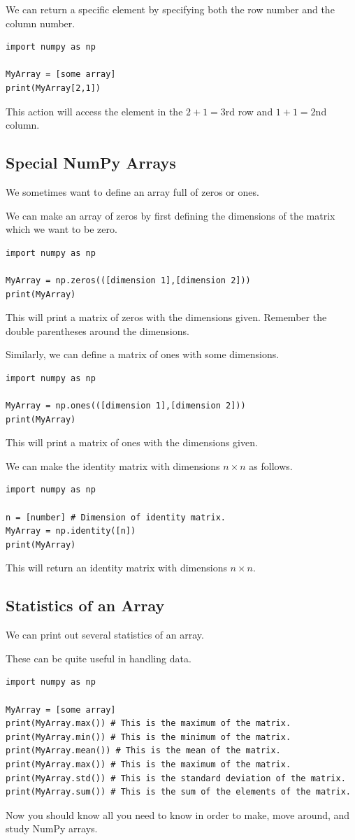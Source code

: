 \documentclass{article}
\begin{document}
We can return a specific element by specifying both the row number and the column number. 
\begin{lstlisting}
import numpy as np

MyArray = [some array]
print(MyArray[2,1])
\end{lstlisting}
This action will access the element in the $2+1=3$rd row and $1+1=2$nd column. 

\subsection{Special NumPy Arrays}
We sometimes want to define an array full of zeros or ones. 

We can make an array of zeros by first defining the dimensions of the matrix which we want to be zero.
\begin{lstlisting}
import numpy as np

MyArray = np.zeros(([dimension 1],[dimension 2]))
print(MyArray)
\end{lstlisting}
This will print a matrix of zeros with the dimensions given. Remember the double parentheses around the dimensions.

Similarly, we can define a matrix of ones with some dimensions.
\begin{lstlisting}
import numpy as np

MyArray = np.ones(([dimension 1],[dimension 2]))
print(MyArray)
\end{lstlisting}
This will print a matrix of ones with the dimensions given.

We can make the identity matrix with dimensions $n\times n$ as follows. 
\begin{lstlisting}
import numpy as np

n = [number] # Dimension of identity matrix.
MyArray = np.identity([n])
print(MyArray)
\end{lstlisting}
This will return an identity matrix with dimensions $n\times n$.
\subsection{Statistics of an Array}
We can print out several statistics of an array.

These can be quite useful in handling data.
\begin{lstlisting}
import numpy as np

MyArray = [some array]
print(MyArray.max()) # This is the maximum of the matrix.
print(MyArray.min()) # This is the minimum of the matrix.
print(MyArray.mean()) # This is the mean of the matrix.
print(MyArray.max()) # This is the maximum of the matrix.
print(MyArray.std()) # This is the standard deviation of the matrix.
print(MyArray.sum()) # This is the sum of the elements of the matrix. 
\end{lstlisting}
Now you should know all you need to know in order to make, move around, and study NumPy arrays.
\end{document}
